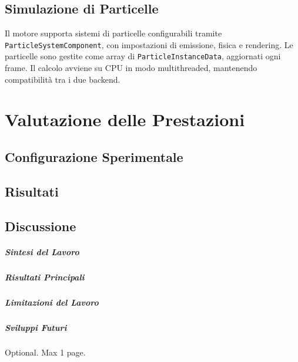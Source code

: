 \documentclass[12pt,a4paper,openright,twoside]{book}
\begin{document}
\section{Simulazione di Particelle}
Il motore supporta sistemi di particelle configurabili tramite \texttt{ParticleSystemComponent}, con impostazioni
di emissione, fisica e rendering. Le particelle sono gestite come array di \texttt{ParticleInstanceData}, aggiornati
ogni frame. Il calcolo avviene su CPU in modo multithreaded, mantenendo compatibilità tra i due backend.

\chapter{Valutazione delle Prestazioni}
\label{chap:valutazione}

\section{Configurazione Sperimentale}

\section{Risultati}

\section{Discussione}

\label{chap:conclusioni}

\paragraph{Sintesi del Lavoro}

\paragraph{Risultati Principali}

\paragraph{Limitazioni del Lavoro}

\paragraph{Sviluppi Futuri}

\backmatter

\nocite{*}




\begin{acknowledgements}
   Optional. Max 1 page.
\end{acknowledgements}
\end{document}
